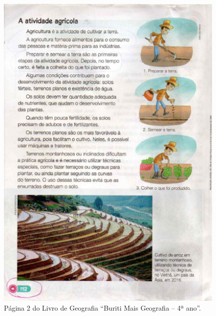 \documentclass[portuguese]{textolivre}
\begin{document}
\begin{figure}[htbp]
\begin{minipage}{0.45\textwidth}
 \includegraphics[width=\textwidth]{Fig2.png}
 \caption{Página 2 do Livro de Geografia “Buriti Mais Geografia – 4ª ano”.}
 \label{fig2}
 \end{minipage}%
\end{figure}
\end{document}
